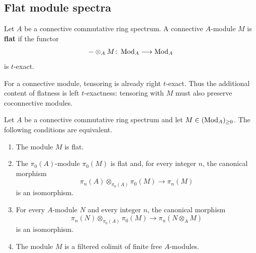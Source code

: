 \subsection{Flat module spectra}

\begin{definition}
\label{def:flat-module-spectrum}
Let $A$ be a connective commutative ring spectrum. A connective
$A$-module $M$ is \textbf{flat} if the functor
\[
    -\otimes_A M
    \colon
    \operatorname{Mod}_A
    \longrightarrow
    \operatorname{Mod}_A
\]
is $t$-exact.
\end{definition}

For a connective module, tensoring is already right \(t\)-exact. Thus the
additional content of flatness is left \(t\)-exactness: tensoring with
\(M\) must also preserve coconnective modules.

\begin{theorem}
\label{thm:spectral-lazard}
Let \(A\) be a connective commutative ring spectrum and let
\(M\in(\operatorname{Mod}_{A})_{\geq0}\). The following conditions are equivalent.
\begin{enumerate}[label=(\roman*)]
    \item The module \(M\) is flat.

    \item The \(\pi_0(A)\)-module \(\pi_0(M)\) is flat and, for every integer
    \(n\), the canonical morphism
    \[
        \pi_n(A)\otimes_{\pi_0(A)}\pi_0(M)
        \longrightarrow
        \pi_n(M)
    \]
    is an isomorphism.

    \item For every \(A\)-module \(N\) and every integer \(n\), the canonical
    morphism
    \[
        \pi_n(N)\otimes_{\pi_0(A)}\pi_0(M)
        \longrightarrow
        \pi_n(N\otimes_A M)
    \]
    is an isomorphism.

    \item The module \(M\) is a filtered colimit of finite free
    \(A\)-modules.
\end{enumerate}
\end{theorem}

